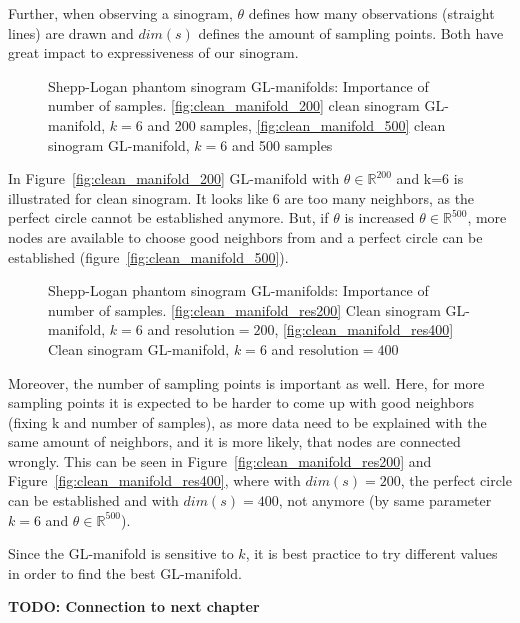 Further, when observing a sinogram, $\theta$ defines how many observations (straight lines) are drawn
and $dim(s)$ defines the amount of sampling points. Both have great impact to expressiveness of our sinogram.

\begin{figure}[H]
    \centering
    \hfill
    \hfill
    \hfill
    \caption{Shepp-Logan phantom sinogram GL-manifolds: Importance of number of samples.
    \ref{fig:clean_manifold_200} clean sinogram GL-manifold, $k = 6$ and 200 samples,
    \ref{fig:clean_manifold_500} clean sinogram GL-manifold, $k = 6$ and 500 samples}
\end{figure}

In Figure~\ref{fig:clean_manifold_200} GL-manifold with $\theta \in \mathbb{R}^{200}$ and k=6 is illustrated
for clean sinogram. It looks like 6 are too many neighbors, as the perfect circle cannot be established anymore.
But, if $\theta$ is increased $\theta \in \mathbb{R}^{500}$, more nodes are available to choose good neighbors from
and a perfect circle can be established (figure~\ref{fig:clean_manifold_500}).

\begin{figure}[H]
    \centering
    \hfill
    \hfill
    \hfill
    \caption{Shepp-Logan phantom sinogram GL-manifolds: Importance of number of samples.
    \ref{fig:clean_manifold_res200} Clean sinogram GL-manifold, $k = 6$ and $\text{resolution}=200$,
    \ref{fig:clean_manifold_res400} Clean sinogram GL-manifold, $k = 6$ and $\text{resolution}=400$}
\end{figure}

Moreover, the number of sampling points is important as well.
Here, for more sampling points it is expected to be harder to come up with good neighbors (fixing k and number of samples),
as more data need to be explained with the same amount of neighbors, and it is more likely, that nodes are connected wrongly.
This can be seen in Figure~\ref{fig:clean_manifold_res200} and Figure~\ref{fig:clean_manifold_res400}, where with $dim(s) = 200$,
the perfect circle can be established and with $dim(s) = 400$, not anymore (by same parameter $k = 6$ and $\theta \in \mathbb{R}^{500}$).

\begin{tcolorbox}[colback=red!5!white,colframe=red!75!black]
    Since the GL-manifold is sensitive to $k$, it is best practice to try different values in order to find the best GL-manifold.
\end{tcolorbox}



\textbf{TODO: Connection to next chapter}